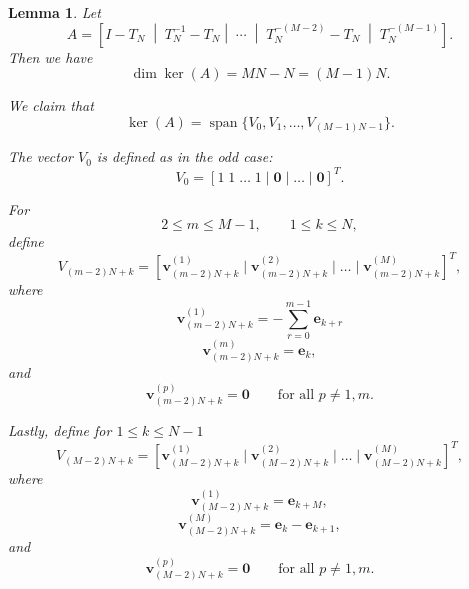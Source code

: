 \documentclass[10pt,a4paper]{amsart}
\newtheorem{lemma}{Lemma}
\begin{document}
\begin{lemma}
Let \[A =\left[I - T_N\;\middle|\;T_N^{-1} - T_N\middle|\;\cdots \;\middle|\; T_N^{-(M-2)} - T_N \;\middle|\; T_N^{-(M-1)} \right]. \]
Then we have
\begin{equation}\label{n even dim}
    \dim\ker(A)=MN-N=(M-1)N.
\end{equation}

We claim that
\begin{equation}\label{n even span}
    \ker(A)= \operatorname{span} \{V_0,V_1,\dots,V_{(M-1)N-1}\}.
\end{equation}

The vector $V_0$ is defined as in the odd case:
\[
V_0=
[1\;1\;\dots\;1
\mid
\mathbf{0}
\mid
\dots
\mid
\mathbf{0}]^T.
\]

For
\[
2\leq m\leq M-1,
\qquad
1\leq k\leq N,
\]
define
\[
V_{(m-2)N+k}
=
[
\mathbf{v}_{(m-2)N+k}^{(1)}
\mid
\mathbf{v}_{(m-2)N+k}^{(2)}
\mid
\dots
\mid
\mathbf{v}_{(m-2)N+k}^{(M)}
]^T,
\]
where
\[
\mathbf{v}_{(m-2)N+k}^{(1)}
=-\sum_{r=0}^{m-1} \mathbf{e}_{k+r}
\]
\[
\mathbf{v}_{(m-2)N+k}^{(m)}
=
\mathbf{e}_k,
\]
and
\[
\mathbf{v}_{(m-2)N+k}^{(p)}
=
\mathbf{0}
\qquad
\text{for all }p\neq 1,m.
\]

Lastly, define  for  $1\leq k\leq N-1$
\[
V_{(M-2)N+k}
=
[
\mathbf{v}_{(M-2)N+k}^{(1)}
\mid
\mathbf{v}_{(M-2)N+k}^{(2)}
\mid
\dots
\mid
\mathbf{v}_{(M-2)N+k}^{(M)}
]^T,
\]
where
\[
\mathbf{v}_{(M-2)N+k}^{(1)}
=
\mathbf{e}_{k+M},
\]
\[
\mathbf{v}_{(M-2)N+k}^{(M)}
=
\mathbf{e}_k-\mathbf{e}_{k+1},
\]
and
\[
\mathbf{v}_{(M-2)N+k}^{(p)}
=
\mathbf{0}
\qquad
\text{for all }p\neq 1,m .
\]
\end{lemma}
\end{document}

